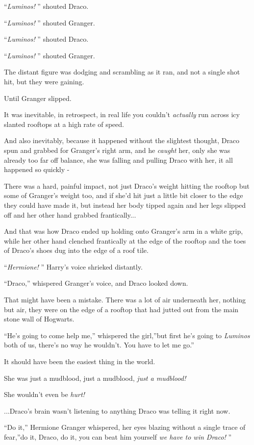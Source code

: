 ``\emph{Luminos!} '' shouted Draco.

``\emph{Luminos!} '' shouted Granger.

``\emph{Luminos!} '' shouted Draco.

``\emph{Luminos!} '' shouted Granger.

The distant figure was dodging and scrambling as it ran, and not a
single shot hit, but they were gaining.

Until Granger slipped.

It was inevitable, in retrospect, in real life you couldn't
\emph{actually} run across icy slanted rooftops at a high rate of speed.

And also inevitably, because it happened without the slightest thought,
Draco spun and grabbed for Granger's right arm, and he \emph{caught}
her, only she was already too far off balance, she was falling and
pulling Draco with her, it all happened so quickly -

There was a hard, painful impact, not just Draco's weight hitting the
rooftop but some of Granger's weight too, and if she'd hit just a little
bit closer to the edge they could have made it, but instead her body
tipped again and her legs slipped off and her other hand grabbed
frantically...

And that was how Draco ended up holding onto Granger's arm in a white
grip, while her other hand clenched frantically at the edge of the
rooftop and the toes of Draco's shoes dug into the edge of a roof tile.

``\emph{Hermione!} '' Harry's voice shrieked distantly.

``Draco,'' whispered Granger's voice, and Draco looked down.

That might have been a mistake. There was a lot of air underneath her,
nothing but air, they were on the edge of a rooftop that had jutted out
from the main stone wall of Hogwarts.

``He's going to come help me,'' whispered the girl,''but first he's
going to \emph{Luminos} both of us, there's no way he wouldn't. You have
to let me go.''

It should have been the easiest thing in the world.

She was just a mudblood, just a mudblood, \emph{just a mudblood!}

She wouldn't even be \emph{hurt!}

...Draco's brain wasn't listening to anything Draco was telling it
right now.

``Do it,'' Hermione Granger whispered, her eyes blazing without a single
trace of fear,''do it, Draco, do it, you can beat him yourself \emph{we
have to win Draco!} ''

